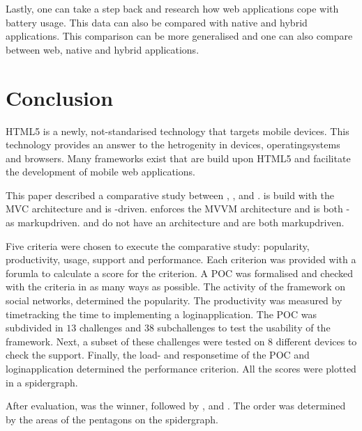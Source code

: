 \documentclass[a4paper]{artikel3}
\begin{document}
Lastly, one can take a step back and research how web applications cope with battery usage.
This data can also be compared with native and hybrid applications.
This comparison can be more generalised and one can also compare between web, native and hybrid applications.


\section{Conclusion} %
\label{sec:conclusion}

HTML5 is a newly,  not-standarised technology that targets mobile devices.
This technology provides an answer to the hetrogenity in devices, operatingsystems and browsers.
Many frameworks exist that are build upon HTML5 and facilitate the development of mobile web applications.

This paper described a comparative study between \sta{},  \kendob{},  \jqma{} and \lungo{}.
\sta{} is build with the MVC architecture and is \js-driven.
\kendob{} enforces the MVVM architecture and is both \js- as markupdriven.
\jqma{} and \lungo{} do not have an architecture and are both markupdriven.

Five criteria were chosen to execute the comparative study:  popularity,  productivity,  usage,  support and performance.
Each criterion was provided with a forumla to calculate a score for the criterion.
A POC was formalised and checked with the criteria in as many ways as possible.
The activity of the framework on social networks, determined the popularity.
The productivity was measured by timetracking the time to implementing a loginapplication.
The POC was subdivided in $13$ challenges and $38$ subchallenges to test the usability of the framework.
Next,  a subset of these challenges were tested on $8$ different devices to check the support.
Finally,  the load- and responsetime of the POC and loginapplication determined the performance criterion.
All the scores were plotted in a spidergraph.

After evaluation, \jqma{} was the winner,  followed by \kendob{}, \lungo{} and \sta{}.
The order was determined by the areas of the pentagons on the spidergraph.




%


\end{document}
